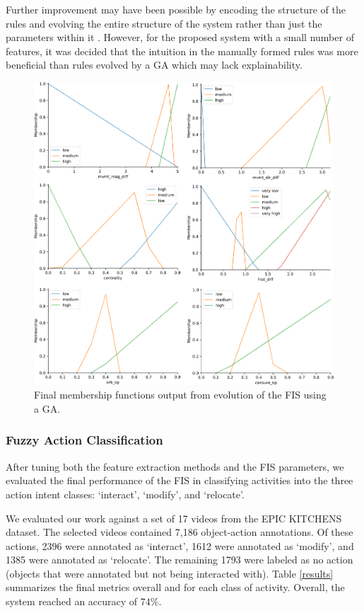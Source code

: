 \documentclass[12pt]{report}
\begin{document}
Further improvement may have been possible by encoding the structure of the rules and evolving the entire structure of the system rather than just the parameters within it \cite{Wong2000OptimizationAlgorithm}. However, for the proposed system with a small number of features, it was decided that the intuition in the manually formed rules was more beneficial than rules evolved by a GA which may lack explainability.

\begin{figure}[t]
\centerline{\includegraphics[width=.95\linewidth]{figure/final_mem_funcs.png}}
\caption{Final membership functions output from evolution of the FIS using a GA.}
\label{final_mem_funcs}
\end{figure}

\subsubsection{Fuzzy Action Classification}
After tuning both the feature extraction methods and the FIS parameters, we evaluated the final performance of the FIS in classifying activities into the three action intent classes: `interact', `modify', and `relocate'.

We evaluated our work against a set of 17 videos from the EPIC KITCHENS dataset. The selected videos contained 7,186 object-action annotations. Of these actions, 2396 were annotated as `interact', 1612 were annotated as `modify', and 1385 were annotated as `relocate'. The remaining 1793 were labeled as no action (objects that were annotated but not being interacted with). Table \ref{results} summarizes the final metrics overall and for each class of activity. Overall, the system reached an accuracy of 74\%.
\end{document}
